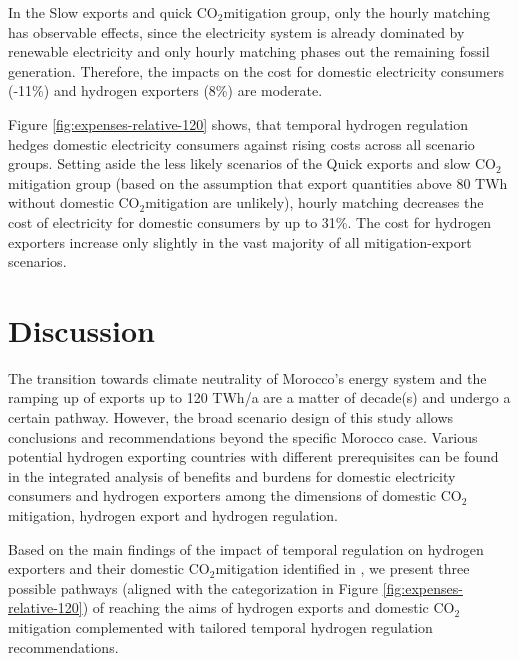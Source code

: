 \documentclass[5p,numafflabel]{elsarticle}
\newcommand{\co}{\ce{CO2}~}
\def\co{CO${}_2${\:}}
\begin{document}
In the Slow exports and quick \co mitigation group, only the hourly matching has observable effects, since the electricity system is already dominated by renewable electricity and only hourly matching phases out the remaining fossil generation. Therefore, the impacts on the cost for domestic electricity consumers (-11\%) and hydrogen exporters (8\%) are moderate.

Figure \ref{fig:expenses-relative-120} shows, that temporal hydrogen regulation hedges domestic electricity consumers against rising costs across all scenario groups.
Setting aside the less likely scenarios of the Quick exports and slow \co mitigation group (based on the assumption that export quantities above 80 TWh without domestic \co mitigation are unlikely), hourly matching decreases the cost of electricity for domestic consumers by up to 31\%. The cost for hydrogen exporters increase only slightly in the vast majority of all mitigation-export scenarios.


\section*{Discussion}
\label{sec:discussion}



The transition towards climate neutrality of Morocco's energy system and the ramping up of exports up to 120 TWh/a are a matter of decade(s) and undergo a certain pathway. 
However, the broad scenario design of this study allows conclusions and recommendations beyond the specific Morocco case.
Various potential hydrogen exporting countries with different prerequisites can be found in the integrated analysis of benefits and burdens for domestic electricity consumers and hydrogen exporters among the dimensions of domestic \co mitigation, hydrogen export and hydrogen regulation.

Based on the main findings of the impact of temporal regulation on hydrogen exporters and their domestic \co mitigation identified in , we present three possible pathways (aligned with the categorization in Figure \ref{fig:expenses-relative-120}) of reaching the aims of hydrogen exports and domestic \co mitigation complemented with tailored temporal hydrogen regulation recommendations.
\end{document}
